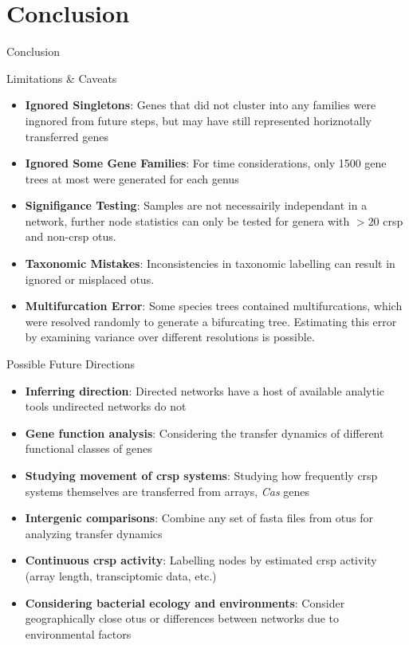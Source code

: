 \documentclass[dvipsnames]{beamer}
\begin{document}
\section*{Conclusion}
\begin{frame}[fragile]{}
    \begin{center}
        \Huge \textcolor{OliveGreen}{Conclusion}
    \end{center}
    \addtocounter{framenumber}{-1}
\end{frame}
\begin{frame}[fragile]{Limitations \& Caveats}
    \begin{itemize}
        \item<2-> \textbf{Ignored Singletons}: Genes that did not cluster into any families were ingnored from future steps, but may have still represented horiznotally transferred genes
        \item<3-> \textbf{Ignored Some Gene Families}: For time considerations, only 1500 gene trees at most were generated for each genus
        \item<4-> \textbf{Signifigance Testing}: Samples are not necessairily independant in a network, further node statistics can only be tested for genera with $> 20$ \ac{crsp} and non-\ac{crsp} \ac{otu}s.
        \item<5-> \textbf{Taxonomic Mistakes}: Inconsistencies in taxonomic labelling can result in ignored or misplaced \ac{otu}s.
        \item<6-> \textbf{Multifurcation Error}: Some species trees contained multifurcations, which were resolved randomly to generate a bifurcating tree. Estimating this error by examining variance over different resolutions is possible.
    \end{itemize}
\end{frame}
\begin{frame}[fragile]{Possible Future Directions}
\begin{itemize}
    \item<2-> \textbf{Inferring direction}: Directed networks have a host of available analytic tools undirected networks do not
    \item<3-> \textbf{Gene function analysis}: Considering the transfer dynamics of different functional classes of genes
    \item<4-> \textbf{Studying movement of \ac{crsp} systems}: Studying how frequently \ac{crsp} systems themselves are transferred from arrays, \textit{Cas} genes
    \item<5-> \textbf{Intergenic comparisons}: Combine any set of fasta files from \ac{otu}s for analyzing transfer dynamics
    \item<6-> \textbf{Continuous \ac{crsp} activity}: Labelling nodes by estimated \ac{crsp} activity (array length, transciptomic data, etc.)
    \item<7-> \textbf{Considering bacterial ecology and environments}: Consider geographically close \ac{otu}s or differences between networks due to environmental factors
\end{itemize}
\end{frame}
\end{document}
